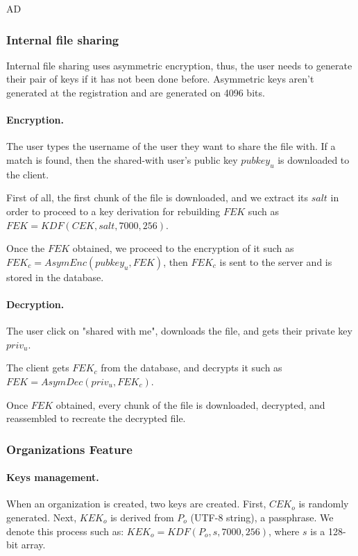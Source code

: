 AD\documentclass[a4paper,10pt]{article}
\begin{document}
\subsubsection{Internal file sharing}

Internal file sharing uses asymmetric encryption, thus, the user needs to generate their pair of
keys if it has not been done before. Asymmetric keys aren't generated at the registration and
are generated on 4096 bits.

\paragraph{Encryption.}

The user types the username of the user they want to share the file with. If a match is found, then the
shared-with user's public key $pubkey_u$ is downloaded to the client.

First of all, the first chunk of the file is downloaded, and we extract its $salt$ in order to proceed
to a key derivation for rebuilding $FEK$ such as $FEK=KDF(CEK, salt, 7000, 256)$.

Once the $FEK$ obtained, we proceed to the encryption of it such as $FEK_c=AsymEnc(pubkey_u, FEK)$, then
$FEK_c$ is sent to the server and is stored in the database.

\paragraph{Decryption.}

The user click on "shared with me", downloads the file, and gets their private key $priv_u$.

The client gets $FEK_c$ from the database, and decrypts it such as $FEK=AsymDec(priv_u, FEK_c)$.

Once $FEK$ obtained, every chunk of the file is downloaded, decrypted, and reassembled to recreate the
decrypted file.

\subsubsection{Organizations Feature}

\paragraph{Keys management.}

When an organization is created, two keys are created.
First, $CEK_o$ is randomly generated. Next, $KEK_o$ is derived
from $P_o$ (UTF-8 string), a passphrase. We denote this process such as:
$KEK_o=KDF(P_o,s,7000,256)$, where $s$ is a 128-bit array.
\end{document}
